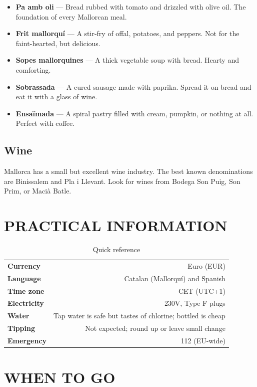 \documentclass[
    language=english,
    doctype=travel-guide,
    institution=none,
]{../../omnilatex}
\begin{document}
\begin{itemize}
    \item \textbf{Pa amb oli} --- Bread rubbed with tomato and drizzled with olive oil. The foundation of every Mallorcan meal.
    \item \textbf{Frit mallorqu\'{i}} --- A stir-fry of offal, potatoes, and peppers. Not for the faint-hearted, but delicious.
    \item \textbf{Sopes mallorquines} --- A thick vegetable soup with bread. Hearty and comforting.
    \item \textbf{Sobrassada} --- A cured sausage made with paprika. Spread it on bread and eat it with a glass of wine.
    \item \textbf{Ensaïmada} --- A spiral pastry filled with cream, pumpkin, or nothing at all. Perfect with coffee.
\end{itemize}

\subsection{Wine}

Mallorca has a small but excellent wine industry. The best known denominations are Binissalem and Pla i Llevant. Look for wines from Bodega Son Puig, Son Prim, or Maci\`{a} Batle.

\section*{PRACTICAL INFORMATION}

\begin{table}[h]
\centering
\begin{tabular}{lr}
\toprule
\textbf{Currency} & Euro (EUR) \\
\textbf{Language} & Catalan (Mallorqu\'{i}) and Spanish \\
\textbf{Time zone} & CET (UTC+1) \\
\textbf{Electricity} & 230V, Type F plugs \\
\textbf{Water} & Tap water is safe but tastes of chlorine; bottled is cheap \\
\textbf{Tipping} & Not expected; round up or leave small change \\
\textbf{Emergency} & 112 (EU-wide) \\
\bottomrule
\end{tabular}
\caption{Quick reference}
\end{table}

\section*{WHEN TO GO}
\end{document}
